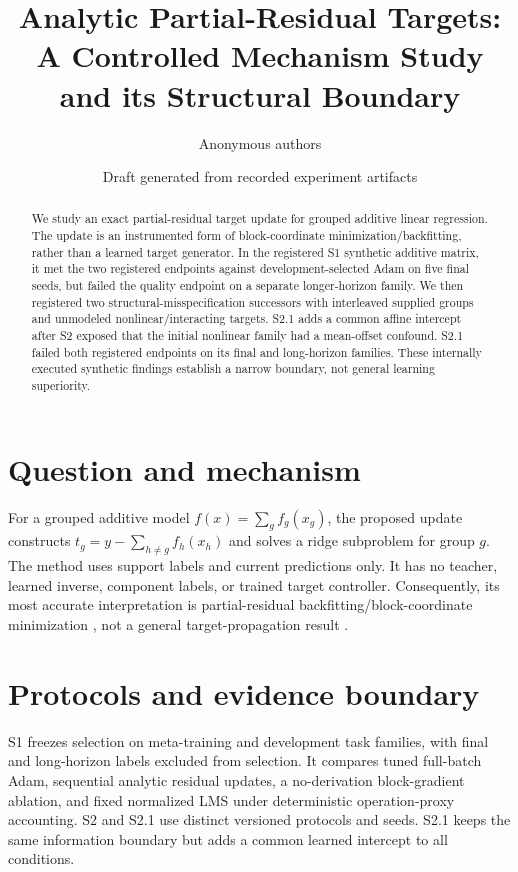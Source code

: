 \documentclass[11pt]{article}
\title{Analytic Partial-Residual Targets: A Controlled Mechanism Study and its Structural Boundary}
\author{Anonymous authors}
\date{Draft generated from recorded experiment artifacts}
\begin{document}
\maketitle

\begin{abstract}
We study an exact partial-residual target update for grouped additive linear regression.  The update is an instrumented form of block-coordinate minimization/backfitting, rather than a learned target generator.  In the registered S1 synthetic additive matrix, it met the two registered endpoints against development-selected Adam on five final seeds, but failed the quality endpoint on a separate longer-horizon family.  We then registered two structural-misspecification successors with interleaved supplied groups and unmodeled nonlinear/interacting targets.  S2.1 adds a common affine intercept after S2 exposed that the initial nonlinear family had a mean-offset confound.  S2.1 failed both registered endpoints on its final and long-horizon families.  These internally executed synthetic findings establish a narrow boundary, not general learning superiority.
\end{abstract}

\section{Question and mechanism}
For a grouped additive model $f(x)=\sum_g f_g(x_g)$, the proposed update constructs $t_g=y-\sum_{h\ne g} f_h(x_h)$ and solves a ridge subproblem for group $g$.  The method uses support labels and current predictions only.  It has no teacher, learned inverse, component labels, or trained target controller.  Consequently, its most accurate interpretation is partial-residual backfitting/block-coordinate minimization \cite{wright2015,buja1989}, not a general target-propagation result \cite{lee2015,jaderberg2016}.

\section{Protocols and evidence boundary}
S1 freezes selection on meta-training and development task families, with final and long-horizon labels excluded from selection.  It compares tuned full-batch Adam, sequential analytic residual updates, a no-derivation block-gradient ablation, and fixed normalized LMS under deterministic operation-proxy accounting.  S2 and S2.1 use distinct versioned protocols and seeds.  S2.1 keeps the same information boundary but adds a common learned intercept to all conditions.
\end{document}
